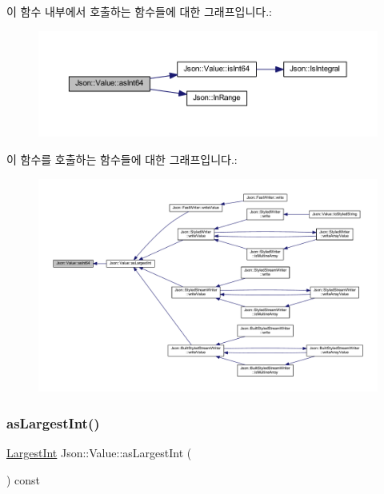 이 함수 내부에서 호출하는 함수들에 대한 그래프입니다.\+:\nopagebreak
\begin{figure}[H]
\begin{center}
\leavevmode
\includegraphics[width=350pt]{class_json_1_1_value_aa647ac4fe51a2e325c063ebe32262b44_cgraph}
\end{center}
\end{figure}
이 함수를 호출하는 함수들에 대한 그래프입니다.\+:\nopagebreak
\begin{figure}[H]
\begin{center}
\leavevmode
\includegraphics[width=350pt]{class_json_1_1_value_aa647ac4fe51a2e325c063ebe32262b44_icgraph}
\end{center}
\end{figure}
\mbox{\label{class_json_1_1_value_ab16f2ea2a117a1b3b576acab8b6a700d}} 
\subsubsection{\texorpdfstring{as\+Largest\+Int()}{asLargestInt()}}
{\footnotesize\ttfamily \hyperlink{class_json_1_1_value_a1cbb82642ed05109b9833e49f042ece7}{Largest\+Int} Json\+::\+Value\+::as\+Largest\+Int (\begin{DoxyParamCaption}{ }\end{DoxyParamCaption}) const}



